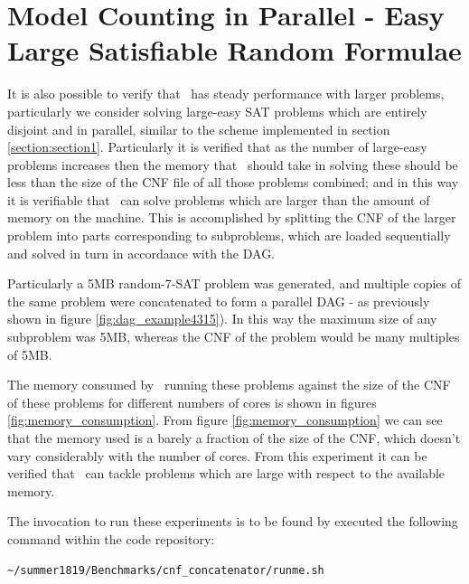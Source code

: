\documentclass[
10pt, %
a4paper, %
oneside, %
headinclude,footinclude, %
BCOR5mm, %
]{scrartcl}
\begin{document}
\clearpage
\section{Model Counting in Parallel - Easy Large Satisfiable Random Formulae}

It is also possible to verify that \dagster\ has steady performance with larger problems, particularly we consider solving large-easy SAT problems which are entirely disjoint and in parallel, similar to the scheme implemented in section \ref{section:section1}.
Particularly it is verified that as the number of large-easy problems increases then the memory that \dagster\ should take in solving these should be less than the size of the CNF file of all those problems combined; and in this way it is verifiable that \dagster\ can solve problems which are larger than the amount of memory on the machine.
This is accomplished by splitting the CNF of the larger problem into parts corresponding to subproblems, which are loaded sequentially and solved in turn in accordance with the DAG.

Particularly a 5MB random-7-SAT problem was generated, and multiple copies of the same problem were concatenated to form a parallel DAG - as previously shown in figure \ref{fig:dag_example4315}).
In this way the maximum size of any subproblem was 5MB, whereas the CNF of the problem would be many multiples of 5MB.

The memory consumed by \dagster\ running these problems against the size of the CNF of these problems for different numbers of cores is shown in figures \ref{fig:memory_consumption}.
From figure \ref{fig:memory_consumption} we can see that the memory used is a barely a fraction of the size of the CNF, which doesn't vary considerably with the number of cores.
From this experiment it can be verified that \dagster\ can tackle problems which are large with respect to the available memory.

The invocation to run these experiments is to be found by executed the following command within the code repository:

\begin{verbatim}
~/summer1819/Benchmarks/cnf_concatenator/runme.sh
\end{verbatim}





\renewcommand{\refname}{\spacedlowsmallcaps{References}} %

\end{document}
